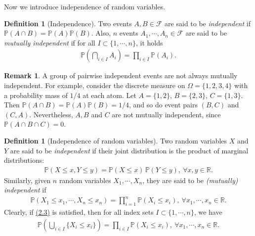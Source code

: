 \documentclass{article}
\numberwithin{equation}{section}
\theoremstyle{plain}
\theoremstyle{definition}
\newtheorem{definition}[theorem]{Definition}
\newtheorem*{remark}{Remark}
\begin{document}
Now we introduce independence of random variables.

\begin{definition}[Independence]\label{def:2.8} Two events $A,B\in\mathscr{F}$ are said to be \textit{independent} if $\mathbb{P}(A\cap B)=\mathbb{P}(A)\mathbb{P}(B)$. Also, $n$ events $A_1,\cdots,A_n\in\mathscr{F}$ are said to be \textit{mutually independent} if for all $I\subset\{1,\cdots,n\}$, it holds
\begin{align*}
	\mathbb{P}\left(\bigcap_{i\in I} A_{i}\right) = \prod_{i\in I}\mathbb{P}(A_{i}).
\end{align*}
\end{definition}
\begin{remark} A group of pairwise independent events are not always mutually independent. For example, consider the discrete measure on $\Omega=\{1,2,3,4\}$ with a probability mass of $1/4$ at each atom. Let $A=\{1,2\}$, $B=\{2,3\}$, $C=\{1,3\}$. Then $\mathbb{P}(A\cap B)=\mathbb{P}(A)\mathbb{P}(B)=1/4$, and so do event pairs $(B,C)$ and $(C,A)$. Nevertheless, $A,B$ and $C$ are not mutually independent, since $\mathbb{P}(A\cap B\cap C)=0$.
\end{remark}
\begin{definition}[Independence of random variables]\label{def:2.9} Two random variables $X$ and $Y$ are said to be \textit{independent} if their joint distribution is the product of marginal distributions:
\begin{align*}
	\mathbb{P}(X\leq x,Y\leq y)=\mathbb{P}(X\leq x)\,\mathbb{P}(Y\leq y),\ \forall x,y\in\mathbb{R}.
\end{align*}
Similarly, given $n$ random variables $X_1,\cdots,X_n$, they are said to be \textit{(mutually) independent} if
\begin{align*}
	\mathbb{P}(X_1\leq x_1,\cdots,X_n\leq x_n)=\prod_{i=1}^n\mathbb{P}(X_i\leq x_i),\ \forall x_1,\cdots,x_n\in\mathbb{R}.\tag{2.3}\label{eq:2.3}
\end{align*}
Clearly, if \hyperref[eq:2.3]{(2.3)} is satisfied, then for all index sets $I\subset\{1,\cdots,n\}$, we have
\begin{align*}
	\mathbb{P}\left(\bigcup_{i\in I}\{X_i\leq x_i\}\right)=\prod_{i\in I}\mathbb{P}(X_i\leq x_i),\ \forall x_1,\cdots,x_n\in\mathbb{R}.
\end{align*}
\end{definition}
\end{document}
